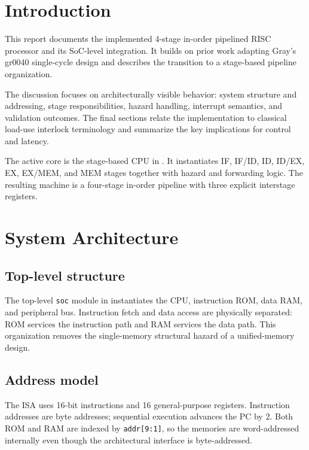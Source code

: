 \documentclass[11pt,a4paper]{article}
\begin{document}

\tableofcontents
\newpage

\section{Introduction}
This report documents the implemented 4-stage in-order pipelined RISC processor and its SoC-level integration.
It builds on prior work adapting Gray's gr0040 single-cycle design and describes the transition to a stage-based pipeline organization.

The discussion focuses on architecturally visible behavior: system structure and addressing, stage responsibilities, hazard handling, interrupt semantics, and validation outcomes. The final sections relate the implementation to classical load-use interlock terminology and summarize the key implications for control and latency.

The active core is the stage-based CPU in . It instantiates IF, IF/ID, ID, ID/EX, EX, EX/MEM, and MEM stages together with hazard and forwarding logic. The resulting machine is a four-stage in-order pipeline with three explicit interstage registers.

\section{System Architecture}

\subsection{Top-level structure}

The top-level \texttt{soc} module in  instantiates the CPU, instruction ROM, data RAM, and peripheral bus. Instruction fetch and data access are physically separated: ROM services the instruction path and RAM services the data path. This organization removes the single-memory structural hazard of a unified-memory design.\cite{cornellhazards}

\subsection{Address model}

The ISA uses 16-bit instructions and 16 general-purpose registers. Instruction addresses are byte addresses; sequential execution advances the PC by 2. Both ROM and RAM are indexed by \texttt{addr[9:1]}, so the memories are word-addressed internally even though the architectural interface is byte-addressed.
\end{document}
